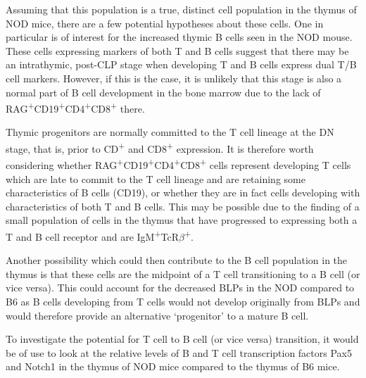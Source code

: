 Assuming that this population is a true, distinct cell population in the thymus of NOD mice, there are a few potential hypotheses about these cells.
One in particular is of interest for the increased thymic B cells seen in the NOD mouse.
These cells expressing markers of both T and B cells suggest that there may be an intrathymic, post-CLP stage when developing T and B cells express dual T/B cell markers.
However, if this is the case, it is unlikely that this stage is also a normal part of B cell development in the bone marrow due to the lack of RAG\textsuperscript{+}CD19\textsuperscript{+}CD4\textsuperscript{+}CD8\textsuperscript{+} there.

Thymic progenitors are normally committed to the T cell lineage at the DN stage, that is, prior to CD\textsuperscript{+} and CD8\textsuperscript{+} expression.
It is therefore worth considering whether RAG\textsuperscript{+}CD19\textsuperscript{+}CD4\textsuperscript{+}CD8\textsuperscript{+}  cells represent developing T cells which are late to commit to the T cell lineage and are retaining some characteristics of B cells (CD19), or whether they are in fact cells developing with characteristics of both T and B cells.
This may be possible due to the finding of a small population of cells in the thymus that have progressed to expressing both a T and B cell receptor and are IgM\textsuperscript{+}TcR$\beta$\textsuperscript{+}.

Another possibility which could then contribute to the B cell population in the thymus is that these cells are the midpoint of a T cell transitioning to a B cell (or vice versa).
This could account for the decreased BLPs in the NOD compared to B6 as B cells developing from T cells would not develop originally from BLPs and would therefore provide an alternative `progenitor' to a mature B cell.

To investigate the potential for T cell to B cell (or vice versa) transition, it would be of use to look at the relative levels of B and T cell transcription factors Pax5 and Notch1 in the thymus of NOD mice compared to the thymus of B6 mice.


